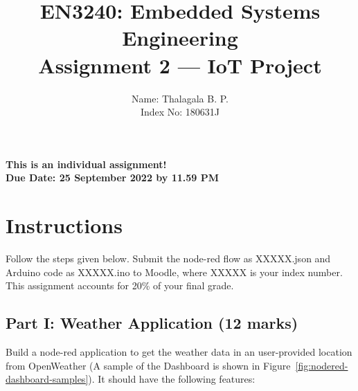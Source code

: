 \documentclass[11pt,letterpaper]{article}
\begin{document}
\title{\vspace{-20mm} EN3240: Embedded Systems Engineering \\Assignment 2 --- IoT Project}

\author{Name: Thalagala B. P. \\ Index No: 180631J}

\maketitle

\begin{center}
	\color{red}\bf This is an individual assignment! \\ Due Date: 25 September 2022 by 11.59 PM
\end{center}

\section*{Instructions}
%

Follow the steps given below.
Submit the node-red flow as XXXXX.json and Arduino code as XXXXX.ino to Moodle, where XXXXX is your index number. This assignment accounts for 20\% of your final grade.


\subsection*{Part I:  Weather Application (12 marks)}

Build a node-red application to get the weather data in an user-provided location from OpenWeather (A sample of the Dashboard is shown in Figure~\ref{fig:nodered-dashboard-samples}). It should have the following features:
\end{document}
